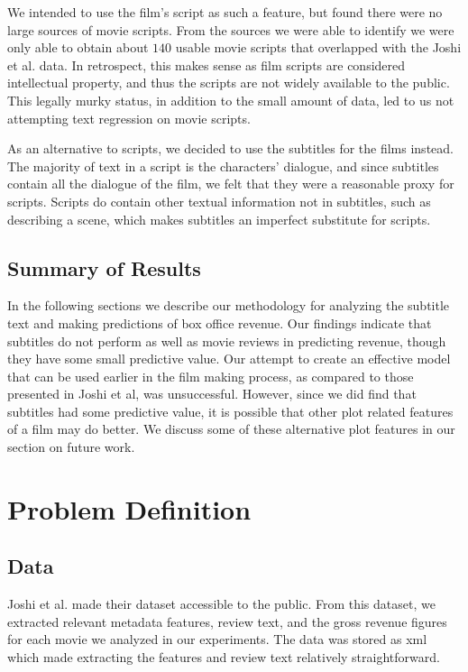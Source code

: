\documentclass[11pt]{article}
\begin{document}
We intended to use the film's script as such a feature, but found
there were no large sources of movie scripts.
From the sources we were able to identify we were only able to
obtain about $140$ usable movie scripts that overlapped with the Joshi et al. data. 
In retrospect, this makes sense as film scripts are considered
intellectual property, and thus the scripts are not widely available to the public.
This legally murky status, in addition to the small amount of data, led to us not
attempting text regression on movie scripts.

As an alternative to scripts, we decided to use the subtitles for the films instead. The
majority of text in a script is the characters' dialogue, and since subtitles contain
all the dialogue of the film, we felt that they were a reasonable proxy for scripts.
Scripts do contain other textual information not in subtitles, such as describing a scene,
which makes subtitles an imperfect substitute for scripts.

\subsection{Summary of Results}
In the following sections we describe our methodology for analyzing the subtitle text
and making predictions of box office revenue. Our findings indicate that subtitles do
not perform as well as movie reviews in predicting revenue, though they have some small
predictive value. Our attempt to create an effective model that can be used
earlier in the film making process, as compared to those presented in Joshi et al, was 
unsuccessful. However, since we did find that subtitles had some predictive value, it 
is possible that other plot related features of a film may do better. We discuss some of
these alternative plot features in our section on future work.

\section{Problem Definition}
\subsection{Data}
Joshi et al. made their dataset accessible to the public. From this dataset,
we extracted relevant metadata features, review text, and the gross revenue figures for each movie we analyzed in our experiments. The data was stored as
xml which made extracting the features and review text relatively straightforward.
\end{document}

